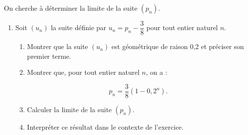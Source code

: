 On cherche à déterminer la limite de la suite $(p_n)$.

\begin{enumerate}[resume]
\item Soit $(u_n)$ la suite définie par $u_n = p_n - \dfrac38$ pour tout entier naturel $n$.
	\begin{enumerate}
		\item Montrer que la suite $(u_n)$ est géométrique de raison 0,2 et préciser son premier terme.
		\item Montrer que, pour tout entier naturel $n$, on a :
		
		\[p_n = \dfrac38\left(1 - 0,2^n\right).\]
		
		\item Calculer la limite de la suite $(p_n)$.
		\item Interpréter ce résultat dans le contexte de l’exercice.
		\end{enumerate}
\end{enumerate}

\medskip
